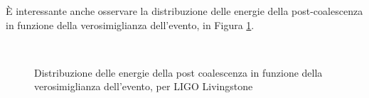 È interessante anche osservare la distribuzione delle energie della post-coalescenza in funzione della verosimiglianza dell'evento, in Figura \ref{fig:likelihood}.
\begin{figure}[ht]
	\vspace{-15pt}
	\centering
	\\
	\caption{Distribuzione delle energie della post coalescenza in funzione della verosimiglianza dell'evento, per LIGO Livingstone}
	\label{fig:likelihood}
\end{figure}